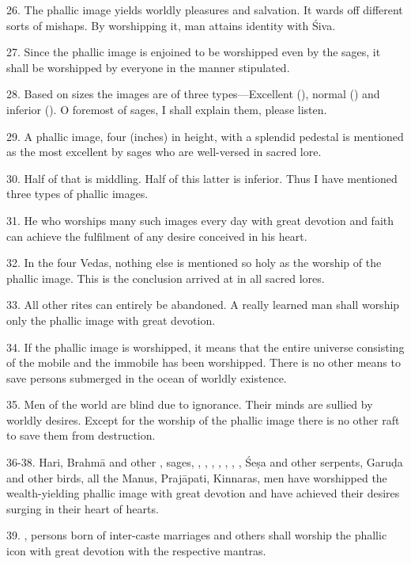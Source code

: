 26. The phallic image yields worldly pleasures and salvation. It wards off
different sorts of mishaps. By worshipping it, man attains identity with Śiva.

27. Since the phallic image is enjoined to be worshipped even by the sages, it
shall be worshipped by everyone in the manner stipulated.

28. Based on sizes the images are of three types—Excellent (), normal
() and inferior (). O foremost of sages, I shall explain
them, please listen.

29. A phallic image, four  (inches) in height, with a splendid
pedestal is mentioned as the most excellent by sages who are well-versed in
sacred lore.

30. Half of that is middling. Half of this latter is inferior. Thus I have
mentioned three types of phallic images.

31. He who worships many such images every day with great devotion and faith can
achieve the fulfilment of any desire conceived in his heart.

32. In the four Vedas, nothing else is mentioned so holy as the worship of
the phallic image. This is the conclusion arrived at in all sacred lores.

33. All other rites can entirely be abandoned. A really learned man shall
worship only the phallic image with great devotion.

34. If the phallic image is worshipped, it means that the entire universe
consisting of the mobile and the immobile has been worshipped. There is no other
means to save persons submerged in the ocean of worldly existence.

35. Men of the world are blind due to ignorance. Their minds are sullied by
worldly desires. Except for the worship of the phallic image there is no other
raft to save them from destruction.

36-38. Hari, Brahmā and other , sages, , ,
, , , , , Śeṣa
and other serpents, Garuḍa and other birds, all the Manus, Prajāpati, Kinnaras,
men \etc have worshipped the wealth-yielding phallic image with great devotion
and have achieved their desires surging in their heart of hearts.

39. , persons born of inter-caste
marriages and others shall worship the phallic icon with great devotion with
the respective mantras.

